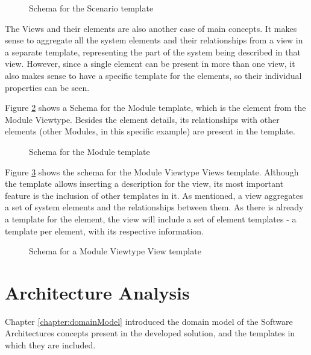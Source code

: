 \documentclass{llncs}
\begin{document}
\begin{figure}
\centering

\caption{Schema for the Scenario template}
\label{figure:scenarioTemplate}
\end{figure}

The Views and their elements are also another case of main concepts. It makes sense to aggregate all the system elements and their relationships from a view in a separate template, representing the part of the system being described in that view. However, since a single element can be present in more than one view, it also makes sense to have a specific template for the elements, so their individual properties can be seen.

Figure \ref{figure:moduleTemplate} shows a Schema for the Module template, which is the element from the Module Viewtype. Besides the element details, its relationships with other elements (other Modules, in this specific example) are present in the template.

\begin{figure}
\centering

\caption{Schema for the Module template}
\label{figure:moduleTemplate}
\end{figure}

Figure \ref{figure:viewTemplate} shows the schema for the Module Viewtype Views template. Although the template allows inserting a description for the view, its most important feature is the inclusion of other templates in it. As mentioned, a view aggregates a set of system elements and the relationships between them. As there is already a template for the element, the view will include a set of element templates - a template per element, with its respective information.

\begin{figure}
\centering

\caption{Schema for a Module Viewtype View template}
\label{figure:viewTemplate}
\end{figure}

\section{Architecture Analysis}
\label{architecture}
Chapter \ref{chapter:domainModel} introduced the domain model of the Software Architectures concepts present in the developed solution, and the templates in which they are included.
\end{document}
